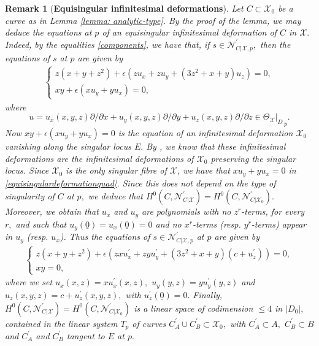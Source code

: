 \documentclass[plain]{amsart}
\newtheorem{remark}[theorem]{\textbf{Remark}}
\begin{document}
\begin{remark}[\bf{Equisingular infinitesimal  deformations}]\label{eq-eq-in}
 Let $C\subset\mathcal X_0$ be a curve as in Lemma \ref{lemma: analytic-type}.
 By the proof of the lemma, we may deduce the equations at $p$ of an equisingular
 infinitesimal deformation of $C$ in $\mathcal X.$ Indeed, by 
  the equalities \eqref{components}, we have that, if $s\in \mathcal N_{C|\mathcal X,p}^\prime,$ 
then the equations of $s$ at $p$ are given by 
\begin{eqnarray}\label{equisingulardeformationquad}
\left\{\begin{array}{l}
z(x+y+z^2)+\epsilon (zu_x+zu_y+(3z^{2}+x+y)u_z)=0,\\
xy+\epsilon (xu_y+yu_x) =0,
\end{array}\right.
\end{eqnarray}
where $$u=u_x(x,y,z)\partial /{\partial x}+u_y(x,y,z)\partial /{\partial y}+
u_z(x,y,z)\partial /{\partial z}\in {\Theta_{\mathcal X}|_D}_{\, p}.$$
Now $xy+\epsilon (xu_y+yu_x)=0$ is the equation of an infinitesimal deformation 
$\mathcal X_0$ vanishing along the singular locus $E.$ By  \cite[Section 2]{chm}, we know that these 
infinitesimal deformations are the infinitesimal deformations of $\mathcal X_0$ preserving the
singular locus. Since $\mathcal X_0$ is the only singular fibre
of $\mathcal X$, we have that  $xu_y+yu_x=0$ in \eqref{equisingulardeformationquad}.
Since this does not depend on the type of singularity of $C$ at $p,$ we deduce that
$H^0(C,\mathcal N_{C|\mathcal X}^\prime)=H^0(C,\mathcal N^\prime_{C|\mathcal X_0}).$ Moreover,
we obtain that $u_x$ and $u_y$ are polynomials with no $z^r$-terms, for every $r,$
and such that $u_y(\underline 0)=u_x(\underline 0)=0$ and
no $x^r$-terms (resp. $y^r$-terms) appear in $u_y$ (resp. $u_x$).  
Thus the equations of $s\in \mathcal N_{C|\mathcal X,p}^\prime$ at $p$ are given by
\begin{eqnarray}\label{equisingulardeformationquad2}
\left\{\begin{array}{l}
z(x+y+z^2)+\epsilon (zxu^\prime_x+zyu^\prime_y+(3z^{2}+x+y)(c+u^\prime_z))=0,\\
xy =0,
\end{array}\right.
\end{eqnarray}
where we set $u_x(x,z)=xu^\prime_x(x,z),$ $u_y(y,z)=yu^\prime_y(y,z)$ and
$u_z(x,y,z)=c+u^\prime_z(x,y,z),$ with $u^\prime_z(\underline 0)=0.$
Finally, $H^0(C,\mathcal N^\prime_{C|\mathcal X})=H^0(C,\mathcal N^\prime_{C|\mathcal X_0})$ is
a linear space of codimension $\leq 4$ in $|D_0|,$ contained in the linear system
$T_p$ of curves $C^\prime_A\cup C^\prime_B\subset\mathcal X_0,$ with $C^\prime_A
\subset A,$ $C^\prime_B\subset B$ and $C_A^\prime$ and $C_B^\prime$ tangent to $E$ at $p.$
\end{remark}
\end{document}
